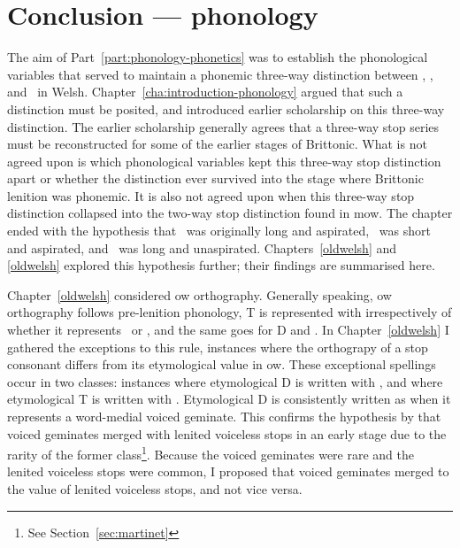 \chapter{Conclusion --- phonology}
\label{cha:conclusion-phonology}

The aim of Part~\ref{part:phonology-phonetics} was to establish the phonological variables that served to maintain a phonemic three-way distinction between \xT, \lT, and \xD\ in Welsh. Chapter~\ref{cha:introduction-phonology} argued that such a distinction must be posited, and introduced earlier scholarship on this three-way distinction. The earlier scholarship generally agrees that a three-way stop series must be reconstructed for some of the earlier stages of Brittonic. What is not agreed upon is which phonological variables kept this three-way stop distinction apart or whether the distinction ever survived into the stage where Brittonic lenition was phonemic. It is also not agreed upon when this three-way stop distinction collapsed into the two-way stop distinction found in \gls{mow}. The chapter ended with the hypothesis that \xT\ was originally long and aspirated, \lT\ was short and aspirated, and \xD\ was long and unaspirated. Chapters~\ref{oldwelsh} and \ref{oldwelsh} explored this hypothesis further; their findings are summarised here.

Chapter~\ref{oldwelsh} considered \gls{ow} orthography. Generally speaking, \gls{ow} orthography follows pre-lenition phonology, \ie \gls{T} is represented with  irrespectively of whether it represents \lT\ or \xT, and the same goes for \gls{D} and . In Chapter~\ref{oldwelsh} I gathered the exceptions to this rule, \ie instances where the orthograpy of a stop consonant differs from its etymological value in \gls{ow}. These exceptional spellings occur in two classes: instances where etymological  \gls{D} is written with , and where etymological \gls{T} is written with .
Etymological \gls{D} is consistently written as  when it represents a word-medial voiced geminate. This confirms the hypothesis by \textcite{martinet_celtic_1952} that voiced geminates merged with lenited voiceless stops in an early stage due to the rarity of the former class\footnote{See Section~\ref{sec:martinet}}. Because the voiced geminates  were rare and the lenited voiceless stops were common, I proposed that voiced geminates merged to the value of lenited voiceless stops, and not vice versa.

